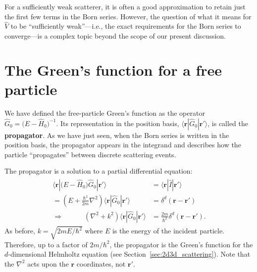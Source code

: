 \documentclass[pra,12pt]{revtex4}
\begin{document}
For a sufficiently weak scatterer, it is often a good approximation to
retain just the first few terms in the Born series.  However, the
question of what it means for $\hat{V}$ to be ``sufficiently
weak''---i.e., the exact requirements for the Born series to
converge---is a complex topic beyond the scope of our present
discussion.

\section{The Green's function for a free particle}
\label{sec:freegreen}

We have defined the free-particle Green's function as the operator
$\hat{G}_0=\big(E-\hat{H}_0\big)^{-1}$.  Its representation in the
position basis, $\langle\mathbf{r}|\hat{G}_0|\mathbf{r}'\rangle$, is
called the \textbf{propagator}.  As we have just seen, when the Born
series is written in the position basis, the propagator appears in the
integrand and describes how the particle ``propagates'' between
discrete scattering events.

The propagator is a solution to a partial differential equation:
\begin{align}
  \begin{aligned}\langle\mathbf{r} |\big(E-\hat{H}_0\big) \hat{G}_0 |\mathbf{r}'\rangle &= \langle\mathbf{r}|\hat{I}|\mathbf{r}'\rangle \\ = \left(E + \frac{\hbar^2}{2m}\nabla^2 \right) \langle\mathbf{r} |\hat{G}_0 |\mathbf{r}'\rangle &= \delta^d(\mathbf{r}-\mathbf{r}') \\ \Rightarrow \qquad\quad \left(\nabla^2 + k^2\right) \langle\mathbf{r} |\hat{G}_0 |\mathbf{r}'\rangle &= \frac{2m}{\hbar^2} \delta^d(\mathbf{r}-\mathbf{r}').\end{aligned}
\end{align}
As before, $k = \sqrt{2mE/\hbar^2}$ where $E$ is the energy of the
incident particle.  Therefore, up to a factor of $2m/\hbar^2$, the
propagator is the Green's function for the $d$-dimensional Helmholtz
equation (see Section~\ref{sec:2d3d_scattering}).  Note that the
$\nabla^2$ acts upon the $\mathbf{r}$ coordinates, not $\mathbf{r}'$.
\end{document}
